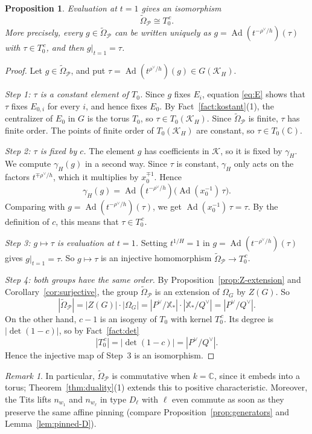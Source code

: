 \documentclass[psamsfonts]{amsart}
\newtheorem{prop}[thm]{Proposition}
\theoremstyle{definition}
\theoremstyle{remark}
\newtheorem{rem}[thm]{Remark}
\numberwithin{equation}{section}
\newcommand{\X}{\mathbb{X}}
\newcommand{\ra}{\rightarrow}
\newcommand{\tOm}{\widetilde{\Omega}}
\DeclareMathOperator{\Ad}{Ad}
\newcommand\cK{\mathcal{K}}
\newcommand\cP{\mathcal{P}}
\newcommand{\CC}{\mathbb{C}}
\numberwithin{equation}{section}
\newcommand{\Om}{\Omega}
\theoremstyle{plain}
\begin{document}
\begin{prop}\label{prop:coxeter-torus}
Evaluation at $t=1$ gives an isomorphism
\[
\tOm_\cP\cong T_0^{\,c}.
\]
More precisely, every $g\in \tOm_\cP$ can be written uniquely as $g=\Ad(t^{-\rho^\vee/h})(\tau)$ with $\tau\in T_0^{\,c}$, and then $g|_{t=1}=\tau$.
\end{prop}

\begin{proof}
Let $g\in \tOm_\cP$, and put $\tau=\Ad(t^{\rho^\vee/h})(g)\in G(\cK_H)$.

\emph{Step 1: $\tau$ is a constant element of $T_0$.} Since $g$ fixes $E_i$, equation \eqref{eq:E} shows that $\tau$ fixes $E_{0,i}$ for every $i$, and hence fixes $E_0$. By Fact~\ref{fact:kostant}(1), the centralizer of $E_0$ in $G$ is the torus $T_0$, so $\tau\in T_0(\cK_H)$. Since $\tOm_\cP$ is finite, $\tau$ has finite order. The points of finite order of $T_0(\cK_H)$ are constant, so $\tau\in T_0(\CC)$.

\emph{Step 2: $\tau$ is fixed by $c$.} The element $g$ has coefficients in $\cK$, so it is fixed by $\gamma_H$. We compute $\gamma_H(g)$ in a second way. Since $\tau$ is constant, $\gamma_H$ only acts on the factors $t^{\mp\rho^\vee/h}$, which it multiplies by $x_0^{\mp1}$. Hence
\[
\gamma_H(g)=\Ad(t^{-\rho^\vee/h})\big(\Ad(x_0^{-1})\,\tau\big).
\]
Comparing with $g=\Ad(t^{-\rho^\vee/h})(\tau)$, we get $\Ad(x_0^{-1})\,\tau=\tau$. By the definition of $c$, this means that $\tau\in T_0^{\,c}$.

\emph{Step 3: $g\mapsto\tau$ is evaluation at $t=1$.} Setting $t^{1/H}=1$ in $g=\Ad(t^{-\rho^\vee/h})(\tau)$ gives $g|_{t=1}=\tau$. So $g\mapsto\tau$ is an injective homomorphism $\tOm_\cP\ra T_0^{\,c}$.

\emph{Step 4: both groups have the same order.} By Proposition~\ref{prop:Z-extension} and Corollary~\ref{cor:surjective}, the group $\tOm_\cP$ is an extension of $\Om_G$ by $Z(G)$. So
\[
|\tOm_\cP|=|Z(G)|\cdot|\Om_G|=|P^\vee/\X_*|\cdot|\X_*/Q^\vee|=|P^\vee/Q^\vee|.
\]
On the other hand, $c-1$ is an isogeny of $T_0$ with kernel $T_0^{\,c}$. Its degree is $|\det(1-c)|$, so by Fact~\ref{fact:det}
\[
|T_0^{\,c}|=|\det(1-c)|=|P^\vee/Q^\vee|.
\]
Hence the injective map of Step~3 is an isomorphism.
\end{proof}

\begin{rem}
In particular, $\tOm_\cP$ is commutative when $k=\CC$, since it embeds into a torus; Theorem~\ref{thm:duality}(1) extends this to positive characteristic. Moreover, the Tits lifts $n_{w_1}$ and $n_{w_\ell}$ in type $D_\ell$ with $\ell$ even commute as soon as they preserve the same affine pinning (compare Proposition~\ref{prop:generators} and Lemma~\ref{lem:pinned-D}).
\end{rem}
\end{document}
